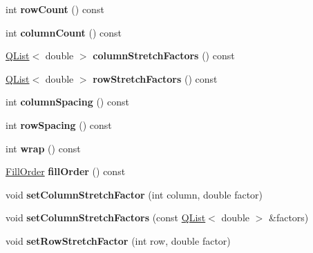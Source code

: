 \begin{DoxyCompactItemize}
int {\bfseries row\+Count} () const
\item 
\mbox{\label{class_q_c_p_layout_grid_a1a2962cbf45011405b64b913afa8e7a2}} 
int {\bfseries column\+Count} () const
\item 
\mbox{\label{class_q_c_p_layout_grid_a8e0e587c386bbcd1b94119f5f44c512d}} 
\hyperlink{class_q_list}{Q\+List}$<$ double $>$ {\bfseries column\+Stretch\+Factors} () const
\item 
\mbox{\label{class_q_c_p_layout_grid_aa33408586427e77e05f79defde7f3568}} 
\hyperlink{class_q_list}{Q\+List}$<$ double $>$ {\bfseries row\+Stretch\+Factors} () const
\item 
\mbox{\label{class_q_c_p_layout_grid_adcf4c387d5996bf6e4ae0ed26138247e}} 
int {\bfseries column\+Spacing} () const
\item 
\mbox{\label{class_q_c_p_layout_grid_a4cb6c680505cd0ce6f85b9e217fd2cd0}} 
int {\bfseries row\+Spacing} () const
\item 
\mbox{\label{class_q_c_p_layout_grid_a8bb71b52b2796c9f05fae6a32d2d0efd}} 
int {\bfseries wrap} () const
\item 
\mbox{\label{class_q_c_p_layout_grid_a6cb6563a13759222ad92ae397bd6c27e}} 
\hyperlink{class_q_c_p_layout_grid_a7d49ee08773de6b2fd246edfed353cca}{Fill\+Order} {\bfseries fill\+Order} () const
\item 
\mbox{\label{class_q_c_p_layout_grid_ae38f31a71687b9d7ee3104852528fb50}} 
void {\bfseries set\+Column\+Stretch\+Factor} (int column, double factor)
\item 
\mbox{\label{class_q_c_p_layout_grid_a6c2591d1a7e2534ce036989543b49e57}} 
void {\bfseries set\+Column\+Stretch\+Factors} (const \hyperlink{class_q_list}{Q\+List}$<$ double $>$ \&factors)
\item 
\mbox{\label{class_q_c_p_layout_grid_a7b0273de5369bd93d942edbaf5b166ec}} 
void {\bfseries set\+Row\+Stretch\+Factor} (int row, double factor)

\end{DoxyCompactItemize}
